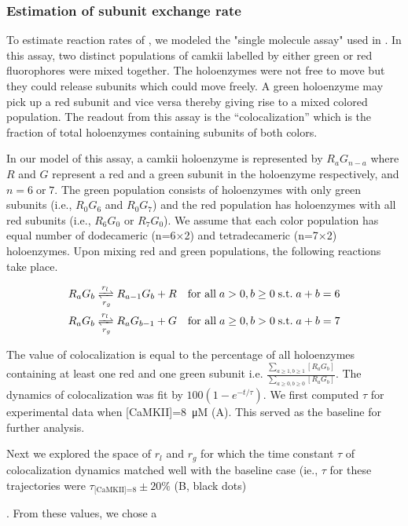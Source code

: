 \documentclass[9pt,lineno,doublespacing]{elife}
\begin{document}
{%
\subsubsection{Estimation of subunit exchange rate}\label{subsec:estimate_exchange_rate}

To estimate reaction rates of , we modeled the "single molecule
assay" used in \cite{stratton_activation-triggered_2014}. In this assay, two
distinct populations of \gls{camkii} labelled by either green or red
fluorophores were mixed together. The holoenzymes were not free to move but they
could release subunits which could move freely. A green holoenzyme may pick up a
red subunit and vice versa thereby giving rise to a mixed colored population.
The readout from this assay is the ``colocalization'' which is the fraction of
total holoenzymes containing subunits of both colors.

In our model of this assay, a \gls{camkii} holoenzyme is represented by
$R_aG_{n-a}$ where $R$ and $G$ represent a red and a green subunit in the
holoenzyme respectively, and $n=6\;\text{or}\;7$. The green population consists
of holoenzymes with only green subunits (i.e., $R_0G_6$ and $R_0G_7$) and the
red population has holoenzymes with all red subunits (i.e., $R_6G_0$ or
$R_7G_0$). We assume that each color population has equal number of dodecameric
(n=6$\times$2) and tetradecameric (n=7$\times$2) holoenzymes. Upon mixing red and green
populations, the following reactions take place.

\begin{equation}\label{eq:mixing_assay}
    \begin{gathered}
        R_aG_b \xrightleftharpoons[r_g]{r_l} R_{a-1}G_b + R 
        \quad \text{for all}\; a>0,b\ge 0\; \text{s.t.}\; a+b=6 \\
        R_aG_b \xrightleftharpoons[r_g]{r_l} R_{a}G_{b-1} + G 
        \quad \text{for all}\; a\ge 0,b> 0\; \text{s.t.}\; a+b=7
    \end{gathered}
\end{equation}

The value of colocalization is equal to the percentage of all holoenzymes
containing at least one red and one green subunit i.e. $\frac{\sum_{a\ge 1, b
\ge 1} [R_aG_b]}{ \sum_{a\ge0,b \ge 0}[R_aG_b]}$. The dynamics of colocalization
was fit by $100(1-e^{-t/\tau})$. We first computed $\tau$ for experimental data
when [CaMKII]=\SI{8}{\micro M} (A). This served
as the baseline for further analysis.

Next we explored the space of $r_l$ and $r_g$ for which the time constant $\tau$
of colocalization dynamics matched well with the baseline case (ie., $\tau$ for
these trajectories were $\tau_{\text{[CaMKII]=8}} \pm 20\%$
(B, black dots)}.  From these values, we chose a
\end{document}
